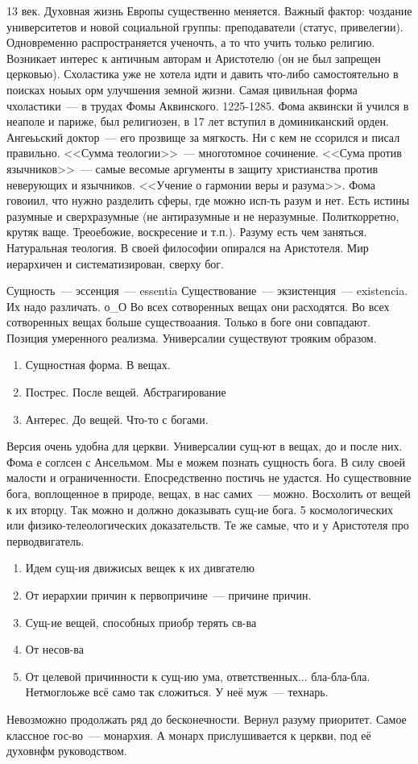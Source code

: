 13 век. Духовная жизнь Европы существенно меняется. Важный фактор: чоздание университетов и новой социальной группы: преподаватели (статус, привелегии). Одновременно распространяется ученочть, а то что учить только религию. Возникает интерес к античным авторам и Аристотелю (он не был запрещен церковью). Схоластика уже не хотела идти и давить что-либо самостоятельно в поисках ноыых орм улучшения земной жизни. Самая цивильная форма чхоластики~--- в трудах Фомы Аквинского. 1225-1285. Фома аквински й учился в неаполе и париже, был религиозен, в 17 лет вступил в доминиканский орден. Ангеььский доктор~--- его прозвище за мягкость. Ни с кем не ссорился и писал правильно. <<Сумма теологии>>~--- многотомное сочинение. <<Сума против язычников>>~--- самые весомые аргументы в защиту христианства против неверующих и язычников. <<Учение о гармонии веры и разума>>. Фома говоиил, что нужно разделить сферы, где можно исп-ть разум и нет. Есть истины разумные и сверхразумные (не антиразумные и не неразумные. Политкорретно, крутяк ваще. Треоебожие, воскресение и т.п.). Разуму есть чем заняться. Натуральная теология. В своей философии опирался на Аристотеля. Мир иерархичен и систематизирован, сверху бог.

Сущность~--- эссенция~--- essentia
Существование~--- экзистенция~--- existencia. Их надо различать. о_О
Во всех сотворенных вещах они расходятся. Во всех сотворенных вещах больше существоаания. Только в боге они совпадают. Позиция умеренного реализма. Универсалии существуют трояким образом.

\begin{enumerate}
	\item Сущностная форма. В вещах.
	\item Пострес. После вещей. Абстрагирование
	\item Антерес. До вещей. Что-то с богами.
\end{enumerate}Версия очень удобна для церкви. Универсалии сущ-ют в вещах, до и после них.
Фома е соглсен с Ансельмом. Мы е можем познать сущность бога. В силу своей малости и ограниченности. Епосредственно постичь не удастся. Но существовние бога, воплощенное в природе, вещах, в нас самих~--- можно. Восхолить от вещей к их вторцу. Так можно и должно доказывать сущ-ие бога. 5 космологических или физико-телеологических доказательств. Те же самые, что и у Аристотеля про перводвигатель.

\begin{enumerate}
	\item Идем сущ-ия движисых вещек к их дивгателю
	\item От иерархии причин к первопричине~--- причине причин.
	\item Сущ-ие вещей, способных приобр терять св-ва
	\item От несов-ва
	\item От целевой причинности к сущ-ию ума, ответственных... бла-бла-бла. Нетмоглоьже всё само так сложиться. У неё муж~--- технарь.
\end{enumerate}
Невозможно продолжать ряд до бесконечности.
Вернул разуму приоритет.
Самое классное гос-во~--- монархия. А монарх прислушивается к церкви, под её духовнфм руководством.


